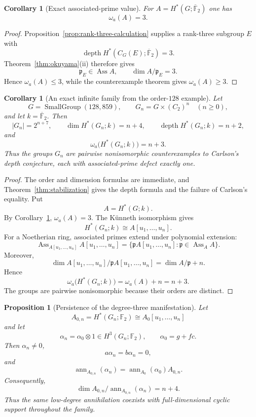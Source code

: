 \documentclass[11pt]{amsart}
\newtheorem{proposition}[theorem]{Proposition}
\newtheorem{corollary}[theorem]{Corollary}
\theoremstyle{definition}
\theoremstyle{remark}
\DeclareMathOperator{\depth}{depth}
\DeclareMathOperator{\Ass}{Ass}
\DeclareMathOperator{\ann}{ann}
\newcommand{\F}{\mathbb F}
\newcommand{\kbar}{\overline{\mathbb F}_{2}}
\newcommand{\SG}[2]{\operatorname{SmallGroup}(#1,#2)}
\begin{document}
\begin{corollary}[Exact associated-prime value]
\label{cor:omega-exact}
For $A=H^*(G;\kbar)$ one has
\[
\omega_a(A)=3.
\]
\end{corollary}

\begin{proof}
Proposition~\ref{prop:rank-three-calculation} supplies a rank-three subgroup $E$ with
\[
\depth H^*(C_G(E);\kbar)=3.
\]
Theorem~\ref{thm:okuyama}(ii) therefore gives
\[
\mathfrak p_E\in\Ass A,
\qquad
\dim A/\mathfrak p_E=3.
\]
Hence $\omega_a(A)\leq3$, while the counterexample theorem gives $\omega_a(A)\geq3$.
\end{proof}


\begin{corollary}[An exact infinite family from the order-$128$ example]
\label{cor:infinite-family}
Let
\[
G=\SG{128}{859},
\qquad
G_n=G\times(C_2)^n
\quad(n\geq0),
\]
and let $k=\kbar$.  Then
\[
|G_n|=2^{n+7},
\qquad
\dim H^*(G_n;k)=n+4,
\qquad
\depth H^*(G_n;k)=n+2,
\]
and
\[
\omega_a\bigl(H^*(G_n;k)\bigr)=n+3.
\]
Thus the groups $G_n$ are pairwise nonisomorphic counterexamples to Carlson's depth conjecture, each with associated-prime defect exactly one.
\end{corollary}

\begin{proof}
The order and dimension formulas are immediate, and Theorem~\ref{thm:stabilization} gives the depth formula and the failure of Carlson's equality.  Put
\[
A=H^*(G;k).
\]
By Corollary~\ref{cor:omega-exact}, $\omega_a(A)=3$.  The K\"unneth isomorphism gives
\[
H^*(G_n;k)\cong A[u_1,\dots,u_n].
\]
For a Noetherian ring, associated primes extend under polynomial extension:
\[
\Ass_{A[u_1,\dots,u_n]}A[u_1,\dots,u_n]
=
\{\mathfrak pA[u_1,\dots,u_n]:\mathfrak p\in\Ass_A A\}.
\]
Moreover,
\[
\dim A[u_1,\dots,u_n]/\mathfrak pA[u_1,\dots,u_n]
=
\dim A/\mathfrak p+n.
\]
Hence
\[
\omega_a\bigl(H^*(G_n;k)\bigr)=\omega_a(A)+n=n+3.
\]
The groups are pairwise nonisomorphic because their orders are distinct.
\end{proof}

\begin{proposition}[Persistence of the degree-three manifestation]
\label{prop:alpha-stabilization}
Let
\[
A_{0,n}=H^*(G_n;\F_2)\cong A_0[u_1,\dots,u_n]
\]
and let
\[
\alpha_n=\alpha_0\otimes1\in H^3(G_n;\F_2),
\qquad
\alpha_0=g+fc.
\]
Then $\alpha_n\neq0$,
\[
a\alpha_n=b\alpha_n=0,
\]
and
\[
\ann_{A_{0,n}}(\alpha_n)
=\ann_{A_0}(\alpha_0)A_{0,n}.
\]
Consequently,
\[
\dim A_{0,n}/\ann_{A_{0,n}}(\alpha_n)=n+4.
\]
Thus the same low-degree annihilation coexists with full-dimensional cyclic support throughout the family.
\end{proposition}
\end{document}
